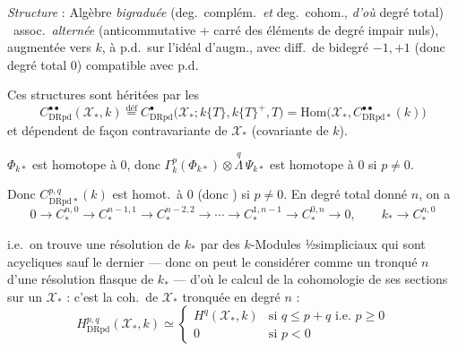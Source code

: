 \documentclass[11pt,a4paper]{article}
\begin{document}
\emph{Structure} :  \struck{\ill{}} Algèbre \emph{bigraduée} (deg.\ complém.\ \emph{et} deg.\ cohom., \emph{d'où} degré total) \ assoc.\ \emph{alternée} (anticommutative + carré des éléments de degré impair nuls), augmentée vers $k$, à p.d.\ sur l'idéal d'augm., avec diff.\ de bidegré $-1,+1$ (donc degré total 0) compatible avec p.d.

Ces structures sont héritées par les
\[ C^{\bullet\bullet}_{\mathrm{DRpd}}(\mathcal{X}_*, k) \overset{\mathrm{déf}}{=} C^\bullet_{\mathrm{DRpd}}\bigl(\mathcal{X}_*; k\{T\}, k\{T\}^+, T\bigr) = \mathrm{Hom}\bigl(\mathcal{X}_*, C^{\bullet\bullet}_{\mathrm{DRpd}*}(k)\bigr) \]
et dépendent de façon contravariante de $\mathcal{X}_*$ (covariante de $k$).

$\Phi_{k*}$ est  \struck{\ill{}} homotope à 0, donc $\Gamma^p_k(\Phi_{k*}) \otimes \overset{q}{\Lambda}\,\Psi_{k*}$ \struck{\ill{}} est homotope à 0 si $p \neq 0$.

Donc $C^{p,q}_{\mathrm{DRpd}*}(k)$ est homot.\ à 0 (donc  ) si $p \neq 0$. En degré total donné $n$, on a
\[ 0 \to C^{n,0}_* \to C^{n-1,1}_* \to C^{n-2,2}_* \to \cdots \to C^{1,n-1}_* \to C^{0,n}_* \to 0, \qquad k_* \to C^{n,0}_* \]

i.e.\ on trouve une résolution   de $k_*$ par des \struck{\ill{}} $k$-Modules ½simpliciaux qui sont acycliques sauf le dernier — donc on peut le considérer comme un tronqué   $n$ d'une résolution flasque de $k_*$ — d'où le calcul de la cohomologie de ses sections sur un $\mathcal{X}_*$ : c'est la coh.\ de $\mathcal{X}_*$ tronquée en degré $n$ :
\[ H^{p,q}_{\mathrm{DRpd}}(\mathcal{X}_*, k) \simeq \begin{cases} H^q(\mathcal{X}_*, k) & \text{si } q \leq p+q \text{ i.e.\ } p \geq 0 \\ 0 & \text{si } p < 0 \end{cases} \]
\end{document}
